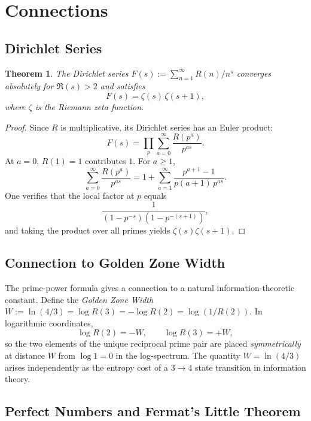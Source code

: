 \documentclass[12pt]{article}
\newtheorem{theorem}{Theorem}[section]
\begin{document}
\section{Connections}
\label{sec:connections}

\subsection{Dirichlet Series}

\begin{theorem}\label{thm:dirichlet}
The Dirichlet series $F(s) := \sum_{n=1}^\infty R(n)/n^s$ converges
absolutely for $\Re(s)>2$ and satisfies
\[
  F(s) = \zeta(s)\,\zeta(s+1),
\]
where $\zeta$ is the Riemann zeta function.
\end{theorem}

\begin{proof}
Since $R$ is multiplicative, its Dirichlet series has an Euler product:
\[
  F(s) = \prod_p \sum_{a=0}^\infty \frac{R(p^a)}{p^{as}}.
\]
At $a=0$, $R(1)=1$ contributes $1$.  For $a\ge1$,
\[
  \sum_{a=0}^\infty\frac{R(p^a)}{p^{as}}
  = 1 + \sum_{a=1}^\infty\frac{p^{a+1}-1}{p(a+1)\,p^{as}}.
\]
One verifies that the local factor at $p$ equals
\[
  \frac{1}{(1-p^{-s})(1-p^{-(s+1)})},
\]
and taking the product over all primes yields $\zeta(s)\zeta(s+1)$.
\end{proof}

\subsection{Connection to Golden Zone Width}

The prime-power formula gives a connection to a natural information-theoretic
constant.  Define the \emph{Golden Zone Width}
$W := \ln(4/3) = \log R(3) = -\log R(2) = \log(1/R(2))$.
In logarithmic coordinates,
\[
  \log R(2) = -W, \qquad \log R(3) = +W,
\]
so the two elements of the unique reciprocal prime pair are placed
\emph{symmetrically} at distance $W$ from $\log 1 = 0$ in the log-spectrum.
The quantity $W=\ln(4/3)$ arises independently as the entropy cost of a
$3\to4$ state transition in information theory.

\subsection{Perfect Numbers and Fermat's Little Theorem}
\end{document}
